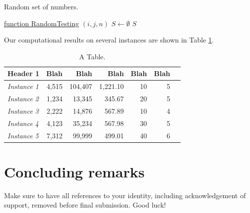 \documentclass[12pt]{article}
\begin{document}
\begin{algorithm}[htbp]
    \caption{Random set of numbers. \label{algExample}}
    \underline{function RandomTesting} $(i, j, n)$\;
    $S\leftarrow \emptyset$\;
  	\Return $S$
\end{algorithm}

Our computational results on several instances are shown in Table \ref{tabExample}. \lipsum[5]

\begin{table}[htbp]
\centering
\caption{A Table. \label{tabExample}}
\begin{tabular}{l|rrrrrr}
Header 1 & Blah & Blah & Blah & Blah & Blah \\
\toprule
\emph{Instance 1} & 4,515 &  104,407  & 1,221.10 & 10 & 5 \\
\emph{Instance 2} &  1,234 &  13,345  & 345.67 & 20 & 5 \\
\emph{Instance 3} & 2,222 & 14,876  & 567.89 & 10 & 4 \\
\emph{Instance 4} & 4,123 & 35,234  & 567.98 & 30 & 5 \\
\emph{Instance 5} & 7,312  & 99,999  & 499.01 & 40 & 6 \\
\end{tabular}
\end{table}

\section{Concluding remarks}

Make sure to have all references to your identity, including acknowledgement of support, removed before final submission. Good luck!


 
 
\end{document}
